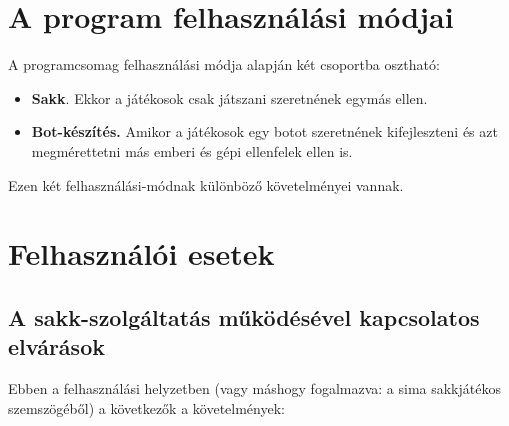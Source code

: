 \documentclass[twoside, a4paper, 12pt]{book}
\begin{document}
\section{A program felhasználási módjai}
A programcsomag felhasználási módja alapján két csoportba osztható:
\begin{itemize}
	\item \textbf{Sakk}. Ekkor a játékosok csak játszani szeretnének egymás ellen.
	
	\item \textbf{Bot-készítés.} Amikor a játékosok egy botot szeretnének kifejleszteni és azt megmérettetni más emberi és gépi ellenfelek ellen is.
\end{itemize}

Ezen két felhasználási-módnak különböző követelményei vannak.
\newpage
\section{Felhasználói esetek}
\subsection{A sakk-szolgáltatás működésével kapcsolatos elvárások}
Ebben a felhasználási helyzetben (vagy máshogy fogalmazva: a sima sakkjátékos szemszögéből) a következők a követelmények:
\end{document}

